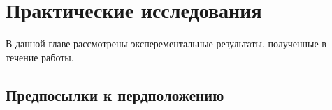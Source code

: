 \chapter{Практические исследования} 
\label{chapter3}

В данной главе рассмотрены эксперементальные результаты, полученные в течение работы.

\section{Предпосылки к пердположению}

